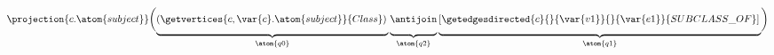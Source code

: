 {
\newcommand{\ph}{\vphantom{\bigg()}}
$
\projection{c.\atom{subject}}
\biggl(
	\underbrace{
		\left(\getvertices{c, \var{c}.\atom{subject}}{Class}\right)
	\ph}_{\atom{q0}}
	\underbrace{
		\antijoin
	\ph}_{\atom{q2}}
	\underbrace{
		\left[\getedgesdirected{c}{}{\var{v1}}{}{\var{e1}}{SUBCLASS\_OF}\right]
	\ph}_{\atom{q1}}
\biggr)
$
}